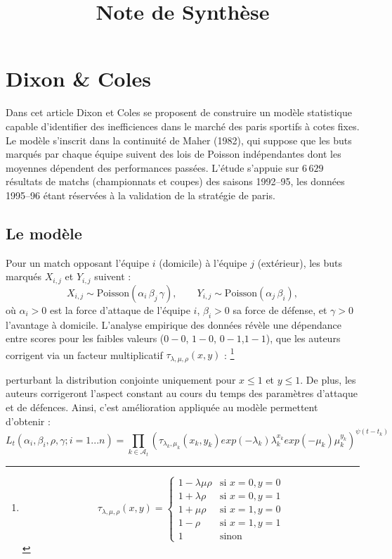 \documentclass[11pt, a4paper]{article}
\title{Note de Synthèse}
\date{}
\begin{document}
\maketitle
\tableofcontents
\newpage

\section{Dixon \& Coles}
Dans cet article \cite{dixon} Dixon et Coles se proposent de construire un 
modèle statistique capable d'identifier des inefficiences dans le marché des paris 
sportifs à cotes fixes. Le modèle s'inscrit dans la continuité de Maher (1982), 
qui suppose que les buts marqués par chaque équipe suivent des lois de Poisson 
indépendantes dont les moyennes dépendent des performances
passées. L'étude s'appuie sur $6\,629$ résultats de matchs (championnats et
coupes) des saisons 1992--95, les données 1995--96 étant réservées à la validation
de la stratégie de paris.


\subsection{Le modèle}

Pour un match opposant l'équipe $i$ (domicile) à l'équipe $j$ (extérieur), les buts
marqués $X_{i,j}$ et $Y_{i,j}$ suivent :
\begin{equation*}
    X_{i,j} \sim \text{Poisson}(\alpha_i \,\beta_j \,\gamma), \qquad
    Y_{i,j} \sim \text{Poisson}(\alpha_j \,\beta_i),
\end{equation*}
où $\alpha_i > 0$ est la force d'attaque de l'équipe $i$, $\beta_i > 0$ sa force de
défense, et $\gamma > 0$ l'avantage à domicile. L'analyse empirique des données révèle
une dépendance entre scores pour les faibles valeurs ($0-0$, $1-0$, $0-1$,$1-1$), 
que les auteurs corrigent via un facteur multiplicatif $\tau_{ \lambda, \mu, \rho }(x, y)$ :
\footnote{
\[
\tau_{\lambda, \mu, \rho}(x, y) = 
\begin{cases} 
    1 - \lambda \mu \rho & \text{si } x=0, y=0 \\ 
    1 + \lambda \rho     & \text{si } x=0, y=1 \\ 
    1 + \mu \rho         & \text{si } x=1, y=0 \\ 
    1 - \rho             & \text{si } x=1, y=1 \\ 
    1                    & \text{sinon}
\end{cases}
\]
}

perturbant la distribution conjointe uniquement pour $x \leq 1$ et $y \leq 1$.
De plus, les auteurs corrigeront l'aspect constant au cours du temps des paramètres 
d'attaque et de défences.
Ainsi, c'est amélioration appliquée au modèle permettent d'obtenir : 
$$L_t (\alpha_i, \beta_i, \rho, \gamma;i=1...n)=\prod_{k\in \mathcal{A}_t}
\left(\tau_{\lambda_k, \mu_k}(x_k, y_k) exp(-\lambda_k)\lambda_k^{x_k} 
exp(-\mu_k)\mu_k^{y_k}\right)^{\psi(t-t_k)}$$
\end{document}
